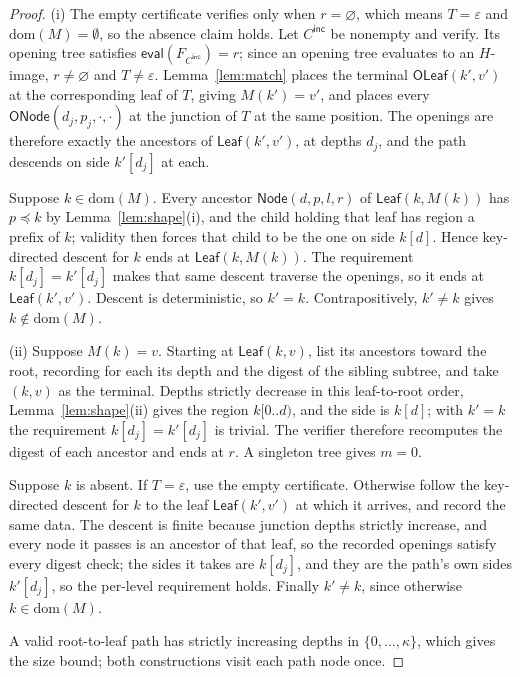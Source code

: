 \documentclass[11pt]{article}
\begin{document}
\begin{proof}
(i) The empty certificate verifies only when $r=\varnothing$, which means $T=\varepsilon$ and $\mathrm{dom}(M)=\emptyset$, so the absence claim holds. Let $C^\mathsf{inc}$ be nonempty and verify. Its opening tree satisfies $\mathsf{eval}(F_{C^\mathsf{inc}})=r$; since an opening tree evaluates to an $H$-image, $r\neq\varnothing$ and $T\neq\varepsilon$. Lemma~\ref{lem:match} places the terminal $\mathsf{OLeaf}(k',v')$ at the corresponding leaf of $T$, giving $M(k')=v'$, and places every $\mathsf{ONode}(d_j,p_j,\cdot,\cdot)$ at the junction of $T$ at the same position. The openings are therefore exactly the ancestors of $\mathsf{Leaf}(k',v')$, at depths $d_j$, and the path descends on side $k'[d_j]$ at each.

Suppose $k\in\mathrm{dom}(M)$. Every ancestor $\mathsf{Node}(d,p,l,r)$ of $\mathsf{Leaf}(k,M(k))$ has $p\preceq k$ by Lemma~\ref{lem:shape}(i), and the child holding that leaf has region a prefix of $k$; validity then forces that child to be the one on side $k[d]$. Hence key-directed descent for $k$ ends at $\mathsf{Leaf}(k,M(k))$. The requirement $k[d_j]=k'[d_j]$ makes that same descent traverse the openings, so it ends at $\mathsf{Leaf}(k',v')$. Descent is deterministic, so $k'=k$. Contrapositively, $k'\neq k$ gives $k\notin\mathrm{dom}(M)$.

(ii) Suppose $M(k)=v$. Starting at $\mathsf{Leaf}(k,v)$, list its ancestors toward the root, recording for each its depth and the digest of the sibling subtree, and take $(k,v)$ as the terminal. Depths strictly decrease in this leaf-to-root order, Lemma~\ref{lem:shape}(ii) gives the region $k[0..d)$, and the side is $k[d]$; with $k'=k$ the requirement $k[d_j]=k'[d_j]$ is trivial. The verifier therefore recomputes the digest of each ancestor and ends at $r$. A singleton tree gives $m=0$.

Suppose $k$ is absent. If $T=\varepsilon$, use the empty certificate. Otherwise follow the key-directed descent for $k$ to the leaf $\mathsf{Leaf}(k',v')$ at which it arrives, and record the same data. The descent is finite because junction depths strictly increase, and every node it passes is an ancestor of that leaf, so the recorded openings satisfy every digest check; the sides it takes are $k[d_j]$, and they are the path's own sides $k'[d_j]$, so the per-level requirement holds. Finally $k'\neq k$, since otherwise $k\in\mathrm{dom}(M)$.

A valid root-to-leaf path has strictly increasing depths in $\{0,\ldots,\kappa\}$, which gives the size bound; both constructions visit each path node once.
\end{proof}
\end{document}
